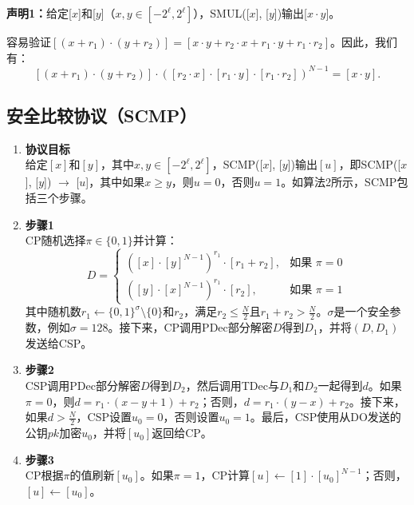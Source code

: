 \textbf{声明1：}给定[\(x\)]和[\(y\)]（\(x,y\in[-2^{\ell},2^{\ell}]\)），SMUL([\(x\)], [\(y\)])输出[\(x\cdot y\)]。

容易验证\([(x+r_{1})\cdot(y+r_{2})]=[x\cdot y+r_{2}\cdot x+r_{1}\cdot y+r_{1}\cdot r_{2}]\)。因此，我们有：
\[
[(x+r_{1})\cdot(y+r_{2})]\cdot([r_{2}\cdot x]\cdot[r_{1}\cdot y]\cdot[r_{1}\cdot r_{2}])^{N-1} = [x\cdot y].
\]

\subsection{安全比较协议（SCMP）}
\begin{enumerate}[leftmargin=*, nosep]
    \item \textbf{协议目标}  \\
    给定\([x]\)和\([y]\)，其中\( x, y \in [-2^\ell, 2^\ell] \)，SCMP([\(x\)], [\(y\)])输出\([u]\)，即SCMP([\(x\)], [\(y\)]) \(\rightarrow\) [\(u\)]，其中如果\( x \geq y \)，则\( u = 0 \)，否则\( u = 1 \)。如算法2所示，SCMP包括三个步骤。
    \item \textbf{步骤1}  \\
    CP随机选择\( \pi \in \{0, 1\} \)并计算：
    \[
    D = 
    \begin{cases} 
    ([x]\cdot[y]^{N-1})^{r_1} \cdot[r_1 + r_2], & \text{如果 } \pi = 0 \\
    ([y]\cdot[x]^{N-1})^{r_1} \cdot[r_2], & \text{如果 } \pi = 1 
    \end{cases}
    \]
    其中随机数\( r_1 \leftarrow \{0, 1\}^\sigma \setminus \{0\} \)和\( r_2 \)，满足\( r_2 \leq \frac{N}{2} \)且\( r_1 + r_2 > \frac{N}{2} \)。\(\sigma\)是一个安全参数，例如\(\sigma = 128\)。接下来，CP调用PDec部分解密\( D \)得到\( D_1 \)，并将\((D, D_1)\)发送给CSP。
    \item \textbf{步骤2}  \\
    CSP调用PDec部分解密\( D \)得到\( D_2 \)，然后调用TDec与\( D_1 \)和\( D_2 \)一起得到\( d \)。如果\( \pi = 0 \)，则\( d = r_1 \cdot (x - y + 1) + r_2 \)；否则，\( d = r_1 \cdot (y - x) + r_2 \)。接下来，如果\( d > \frac{N}{2} \)，CSP设置\( u_0 = 0 \)，否则设置\( u_0 = 1 \)。最后，CSP使用从DO发送的公钥\( pk \)加密\( u_0 \)，并将\([u_0]\)返回给CP。
    \item \textbf{步骤3}  \\
    CP根据\( \pi \)的值刷新\([u_0]\)。如果\( \pi = 1 \)，CP计算\([u] \leftarrow [1] \cdot [u_0]^{N-1} \)；否则，\([u] \leftarrow [u_0]\)。
\end{enumerate}

